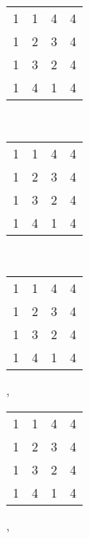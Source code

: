 \documentclass{beamer}
\newcommand{\jmp}{\vskip3pt}
\begin{document}
\begin{frame}
\begin{center}
\begin{tabular}{@{}c@{}c@{}c@{}c@{}}
1&\color{lgr}1&\color{lgr}4&4\\
\color{lgr}1&\color{lgr}2&\color{lgr}3&\color{lgr}4\\
\color{lgr}1&\color{lgr}3&\color{lgr}2&\color{lgr}4\\
1&\color{lgr}4&\color{lgr}1&4\\
\end{tabular}\\\jmp 
\begin{tabular}{@{}c@{}c@{}c@{}c@{}}
\color{lgr}1&\color{lgr}1&\color{lgr}4&\color{lgr}4\\
\color{lgr}1&2&\color{lgr}3&\color{lgr}4\\
\color{lgr}1&\color{lgr}3&\color{lgr}2&\color{lgr}4\\
\color{lgr}1&\color{lgr}4&\color{lgr}1&\color{lgr}4\\
\end{tabular}\ \ \ \ \ \ \ \ \ \ \ \ \ 
\begin{tabular}{@{}c@{}c@{}c@{}c@{}}
1&\color{lgr}1&\color{lgr}4&\color{lgr}4\\
\color{lgr}1&\color{lgr}2&\color{lgr}3&\color{lgr}4\\
\color{lgr}1&\color{lgr}3&\color{lgr}2&\color{lgr}4\\
\color{lgr}1&\color{lgr}4&\color{lgr}1&\color{lgr}4\\
\end{tabular},\ \ \ 
\begin{tabular}{@{}c@{}c@{}c@{}c@{}}
\color{lgr}1&\color{lgr}1&\color{lgr}4&\color{lgr}4\\
\color{lgr}1&\color{lgr}2&\color{lgr}3&\color{lgr}4\\
\color{lgr}1&\color{lgr}3&\color{lgr}2&\color{lgr}4\\
\color{lgr}1&\color{lgr}4&\color{lgr}1&4\\
\end{tabular},\ \ \ 


\end{center}
\end{frame}
\end{document}
